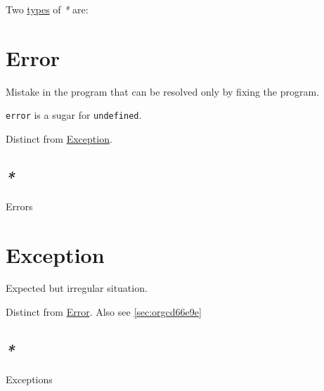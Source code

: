 \documentclass[a4paper,14pt,oneside]{book}
\begin{document}
Two \hyperref[org388cef7]{types} of \emph{*} are:

\chapter{\label{orgf69def2}Error}
\label{sec:orgade6039}
Mistake in the program that can be resolved only by fixing the program.

\texttt{error} is a sugar for \texttt{undefined}.

Distinct from \hyperref[orgcb9e0a2]{Exception}.

\section{\emph{*}}
\label{sec:orgc2659be}

\label{org9e349e6}Errors

\chapter{\label{orgcb9e0a2}Exception}
\label{sec:orgda916ee}
Expected but irregular situation.

Distinct from \hyperref[orgf69def2]{Error}. Also see \ref{sec:orgcd66e9e}

\section{\emph{*}}
\label{sec:org7e29909}

\label{org69f85f7}Exceptions
\end{document}
